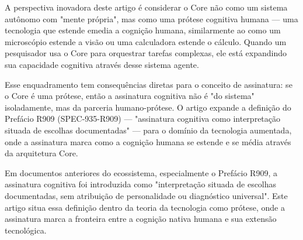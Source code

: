 \documentclass[12pt,a4paper]{article}
\begin{document}
A perspectiva inovadora deste artigo é considerar o Core não como um sistema autônomo com "mente própria", mas como uma prótese cognitiva humana — uma tecnologia que estende emedia a cognição humana, similarmente ao como um microscópio estende a visão ou uma calculadora estende o cálculo. Quando um pesquisador usa o Core para orquestrar tarefas complexas, ele está expandindo sua capacidade cognitiva através desse sistema agente.

Esse enquadramento tem consequências diretas para o conceito de assinatura: se o Core é uma prótese, então a assinatura cognitiva não é "do sistema" isoladamente, mas da parceria humano-prótese. O artigo expande a definição do Prefácio R909 (SPEC-935-R909) — "assinatura cognitiva como interpretação situada de escolhas documentadas" — para o domínio da tecnologia aumentada, onde a assinatura marca como a cognição humana se estende e se média através da arquitetura Core.

Em documentos anteriores do ecossistema, especialmente o Prefácio R909, a assinatura cognitiva foi introduzida como "interpretação situada de escolhas documentadas, sem atribuição de personalidade ou diagnóstico universal". Este artigo situa essa definição dentro da teoria da tecnologia como prótese, onde a assinatura marca a fronteira entre a cognição nativa humana e sua extensão tecnológica.



\end{document}
